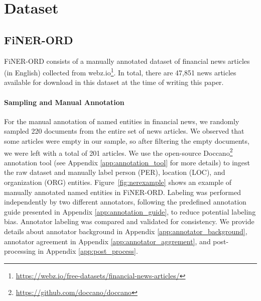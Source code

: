 \documentclass[11pt]{article}
\begin{document}
\section{Dataset}

\subsection{FiNER-ORD}
\label{sec:news_data}
FiNER-ORD consists of a manually annotated dataset of financial news articles (in English) collected from webz.io\footnote{\url{https://webz.io/free-datasets/financial-news-articles/}}. In total, there are 47,851 news articles available for download in this dataset at the time of writing this paper. 

\paragraph{Sampling and Manual Annotation}
\label{sec:samp&manual_annot}
 For the manual annotation of named entities in financial news, we randomly sampled 220 documents from the entire set of news articles. We observed that some articles were empty in our sample, so after filtering the empty documents, we were left with a total of 201 articles. We use the open-source Doccano\footnote{\url{https://github.com/doccano/doccano}} annotation tool (see Appendix \ref{app:annotation_tool} for more details) to ingest the raw dataset and manually label person (PER), location (LOC), and organization (ORG) entities. Figure~\ref{fig:nerexample} shows an example of manually annotated named entities in FiNER-ORD. Labeling was performed independently by two different annotators, following the predefined annotation guide presented in Appendix \ref{app:annotation_guide}, to reduce potential labeling bias. Annotator labeling was compared and validated for consistency. We provide details about annotator background in Appendix \ref{app:annotator_background}, annotator agreement in Appendix \ref{app:annotator_aggrement}, and post-processing in Appendix \ref{app:post_process}. 


\end{document}
